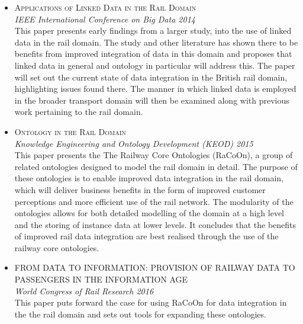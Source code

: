 \begin{itemize}	
	\item \textsc{Applications of Linked Data in the Rail Domain} \\ \textit{IEEE International Conference on Big Data 2014} \\
	This paper presents early findings from a larger study, into the use of linked data in the rail domain. The study and other literature has shown there to be benefits from improved integration of data in this domain and proposes that linked data in general and ontology in particular will address this. The paper will set out the current state of data integration in the British rail domain, highlighting issues found there. The manner in which linked data is employed in the broader transport domain will then be examined along with previous work pertaining to the rail domain. 
    \item \textsc{Ontology in the Rail Domain} \\ \textit{Knowledge Engineering and Ontology Development (KEOD) 2015} \\
    This paper presents the The Railway Core Ontologies (RaCoOn), a group of related ontologies designed to model the rail domain in detail. The purpose of these ontologies is to enable improved data integration in the rail domain, which will deliver business benefits in the form of improved customer perceptions and more efficient use of the rail network. The modularity of the ontologies allows for both detailed modelling of the domain at a high level and the storing of instance data at lower levels. It concludes that the benefits of improved rail data integration are best realised through the use of the railway core ontologies.   
    \item \textsc{FROM DATA TO INFORMATION: PROVISION OF RAILWAY DATA TO PASSENGERS IN THE INFORMATION AGE} \\ \textit{World Congress of Rail Research 2016} \\
    This paper puts forward the case for using RaCoOn for data integration in the the rail domain and sets out tools for expanding these ontologies.
\end{itemize}
